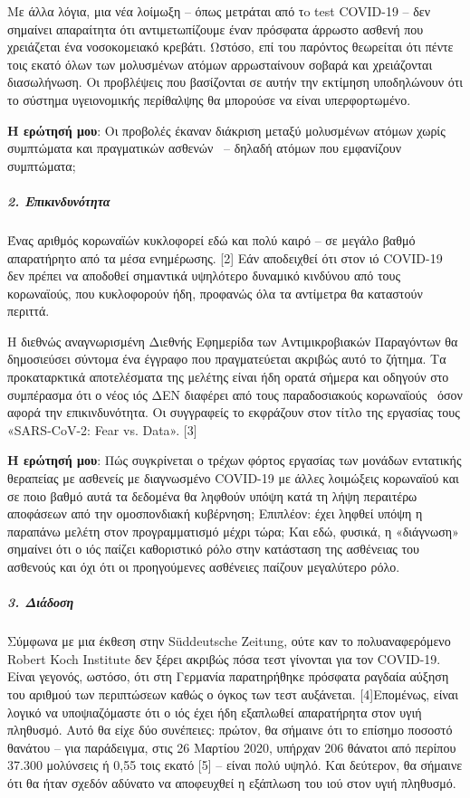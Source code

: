 Με άλλα λόγια, μια νέα λοίμωξη -- όπως μετράται από τo test COVID-19 --
δεν σημαίνει απαραίτητα ότι αντιμετωπίζουμε έναν πρόσφατα άρρωστο ασθενή
που χρειάζεται ένα νοσοκομειακό κρεβάτι. Ωστόσο, επί του παρόντος
θεωρείται ότι πέντε τοις εκατό όλων των μολυσμένων ατόμων αρρωσταίνουν
σοβαρά και χρειάζονται διασωλήνωση. Οι προβλέψεις που βασίζονται σε
αυτήν την εκτίμηση υποδηλώνουν ότι το σύστημα υγειονομικής περίθαλψης θα
μπορούσε να είναι υπερφορτωμένο.

\textbf{Η ερώτησή μου}: Οι προβολές έκαναν διάκριση μεταξύ μολυσμένων
ατόμων χωρίς συμπτώματα και πραγματικών ασθενών~ -- δηλαδή ατόμων που
εμφανίζουν συμπτώματα;

\hypertarget{2-ux3b5ux3c0ux3b9ux3baux3b9ux3bdux3b4ux3c5ux3bdux3ccux3c4ux3b7ux3c4ux3b1}{%
\subparagraph{\texorpdfstring{\textbf{2.
Επικινδυνότητα}}{2. Επικινδυνότητα}}\label{2-ux3b5ux3c0ux3b9ux3baux3b9ux3bdux3b4ux3c5ux3bdux3ccux3c4ux3b7ux3c4ux3b1}}

Ένας αριθμός κορωναϊών κυκλοφορεί εδώ και πολύ καιρό -- σε μεγάλο βαθμό
απαρατήρητο από τα μέσα ενημέρωσης. {[}2{]} Εάν αποδειχθεί ότι στον ιό
COVID-19 δεν πρέπει να αποδοθεί σημαντικά υψηλότερο δυναμικό κινδύνου
από τους~ κορωναϊούς, που κυκλοφορούν ήδη, προφανώς όλα τα αντίμετρα θα
καταστούν περιττά.

Η διεθνώς αναγνωρισμένη Διεθνής Εφημερίδα των Αντιμικροβιακών Παραγόντων
θα δημοσιεύσει σύντομα ένα έγγραφο που πραγματεύεται ακριβώς αυτό το
ζήτημα. Τα προκαταρκτικά αποτελέσματα της μελέτης είναι ήδη ορατά σήμερα
και οδηγούν στο συμπέρασμα ότι ο νέος ιός ΔΕΝ διαφέρει από τους
παραδοσιακούς κορωναϊούς~ όσον αφορά την επικινδυνότητα. Οι συγγραφείς
το εκφράζουν στον τίτλο της εργασίας τους «SARS-CoV-2: Fear vs. Data».
{[}3{]}

\textbf{Η ερώτησή μου}: Πώς συγκρίνεται ο τρέχων φόρτος εργασίας των
μονάδων εντατικής θεραπείας με ασθενείς με διαγνωσμένο COVID-19 με άλλες
λοιμώξεις κορωναϊού και σε ποιο βαθμό αυτά τα δεδομένα θα ληφθούν υπόψη
κατά τη λήψη περαιτέρω αποφάσεων από την ομοσπονδιακή κυβέρνηση;
Επιπλέον: έχει ληφθεί υπόψη η παραπάνω μελέτη στον προγραμματισμό μέχρι
τώρα; Και εδώ, φυσικά, η «διάγνωση» σημαίνει ότι ο ιός παίζει
καθοριστικό ρόλο στην κατάσταση της ασθένειας του ασθενούς και όχι ότι
οι προηγούμενες ασθένειες παίζουν μεγαλύτερο ρόλο.

\hypertarget{3-ux3b4ux3b9ux3acux3b4ux3bfux3c3ux3b7}{%
\subparagraph{\texorpdfstring{\textbf{3.
Διάδοση}}{3. Διάδοση}}\label{3-ux3b4ux3b9ux3acux3b4ux3bfux3c3ux3b7}}

Σύμφωνα με μια έκθεση στην Süddeutsche Zeitung, ούτε καν το
πολυαναφερόμενο Robert Koch Institute δεν ξέρει ακριβώς πόσα τεστ
γίνονται για τον COVID-19. Είναι γεγονός, ωστόσο, ότι στη Γερμανία
παρατηρήθηκε πρόσφατα ραγδαία αύξηση του αριθμού των περιπτώσεων καθώς ο
όγκος των τεστ αυξάνεται. {[}4{]}Επομένως, είναι λογικό να υποψιαζόμαστε
ότι ο ιός έχει ήδη εξαπλωθεί απαρατήρητα στον υγιή πληθυσμό. Αυτό θα
είχε δύο συνέπειες: πρώτον, θα σήμαινε ότι το επίσημο ποσοστό θανάτου --
για παράδειγμα, στις 26 Μαρτίου 2020, υπήρχαν 206 θάνατοι από περίπου
37.300 μολύνσεις ή 0,55 τοις εκατό {[}5{]} -- είναι πολύ υψηλό. Και
δεύτερον, θα σήμαινε ότι θα ήταν σχεδόν αδύνατο να αποφευχθεί η εξάπλωση
του ιού στον υγιή πληθυσμό.

